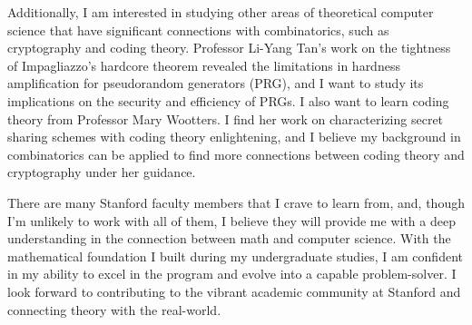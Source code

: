 \documentclass[12pt]{article}
\begin{document}
Additionally, I am interested in studying other areas of theoretical computer science that have significant connections with combinatorics, such as cryptography and coding theory. Professor Li-Yang Tan's work on the tightness of Impagliazzo's hardcore theorem \cite{blanc2024samplecomplexitysmoothboosting} revealed the limitations in hardness amplification for pseudorandom generators (PRG), and I want to study its implications on the security and efficiency of PRGs. I also want to learn coding theory from Professor Mary Wootters. I find her work on characterizing secret sharing schemes with coding theory\cite{blackwell2023characterizationoptimalratelinearhomomorphic} enlightening, and I believe my background in combinatorics can be applied to find more connections between coding theory and cryptography under her guidance.

There are many Stanford faculty members that I crave to learn from, and, though I'm unlikely to work with all of them, I believe they will provide me with a deep understanding in the connection between math and computer science. With the mathematical foundation I built during my undergraduate studies, I am confident in my ability to excel in the program and evolve into a capable problem-solver. I look forward to contributing to the vibrant academic community at Stanford and connecting theory with the real-world.

\newpage



\end{document}
